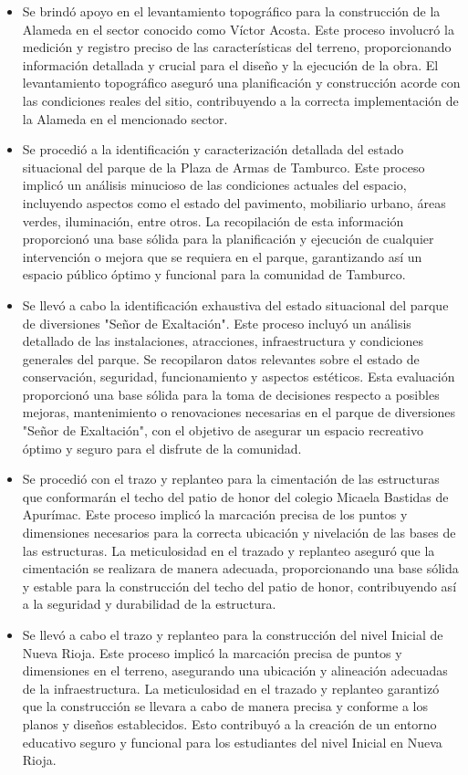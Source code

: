 \begin{itemize}
	\item Se brindó apoyo en el levantamiento topográfico para la construcción de la Alameda en el sector conocido como Víctor Acosta. Este proceso involucró la medición y registro preciso de las características del terreno, proporcionando información detallada y crucial para el diseño y la ejecución de la obra. El levantamiento topográfico aseguró una planificación y construcción acorde con las condiciones reales del sitio, contribuyendo a la correcta implementación de la Alameda en el mencionado sector.
	\item Se procedió a la identificación y caracterización detallada del estado situacional del parque de la Plaza de Armas de Tamburco. Este proceso implicó un análisis minucioso de las condiciones actuales del espacio, incluyendo aspectos como el estado del pavimento, mobiliario urbano, áreas verdes, iluminación, entre otros. La recopilación de esta información proporcionó una base sólida para la planificación y ejecución de cualquier intervención o mejora que se requiera en el parque, garantizando así un espacio público óptimo y funcional para la comunidad de Tamburco.
	\item Se llevó a cabo la identificación exhaustiva del estado situacional del parque de diversiones "Señor de Exaltación". Este proceso incluyó un análisis detallado de las instalaciones, atracciones, infraestructura y condiciones generales del parque. Se recopilaron datos relevantes sobre el estado de conservación, seguridad, funcionamiento y aspectos estéticos. Esta evaluación proporcionó una base sólida para la toma de decisiones respecto a posibles mejoras, mantenimiento o renovaciones necesarias en el parque de diversiones "Señor de Exaltación", con el objetivo de asegurar un espacio recreativo óptimo y seguro para el disfrute de la comunidad.
	\item Se procedió con el trazo y replanteo para la cimentación de las estructuras que conformarán el techo del patio de honor del colegio Micaela Bastidas de Apurímac. Este proceso implicó la marcación precisa de los puntos y dimensiones necesarios para la correcta ubicación y nivelación de las bases de las estructuras. La meticulosidad en el trazado y replanteo aseguró que la cimentación se realizara de manera adecuada, proporcionando una base sólida y estable para la construcción del techo del patio de honor, contribuyendo así a la seguridad y durabilidad de la estructura.
	\item Se llevó a cabo el trazo y replanteo para la construcción del nivel Inicial de Nueva Rioja. Este proceso implicó la marcación precisa de puntos y dimensiones en el terreno, asegurando una ubicación y alineación adecuadas de la infraestructura. La meticulosidad en el trazado y replanteo garantizó que la construcción se llevara a cabo de manera precisa y conforme a los planos y diseños establecidos. Esto contribuyó a la creación de un entorno educativo seguro y funcional para los estudiantes del nivel Inicial en Nueva Rioja.

\end{itemize}
